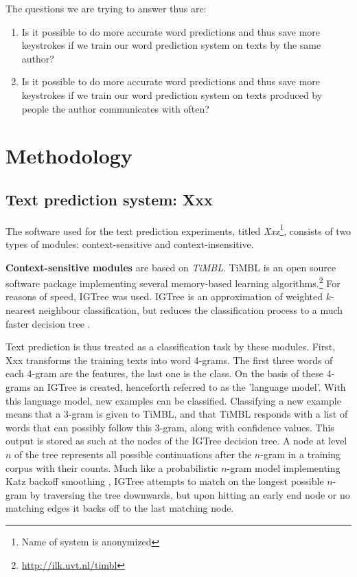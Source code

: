 \documentclass[11pt]{article}
\begin{document}
The questions we are trying to answer thus are:

\begin{enumerate}
\item Is it possible to do more accurate word predictions and thus save more keystrokes if we train our word prediction system on texts by the same author?
\item Is it possible to do more accurate word predictions and thus save more keystrokes if we train our word prediction system on texts produced by people the author communicates with often?
\end{enumerate}

\section{Methodology}

\subsection{Text prediction system: Xxx}

The software used for the text prediction experiments, titled \emph{Xxx}\footnote{Name of system is anonymized}, consists of two types of modules: context-sensitive and context-insensitive. 

\textbf{Context-sensitive modules} are based on \emph{TiMBL}. TiMBL is an open source software package implementing several memory-based learning algorithms.\footnote{\url{http://ilk.uvt.nl/timbl}} For reasons of speed, IGTree was used. IGTree is an approximation of weighted $k$-nearest neighbour classification, but reduces the classification process to a much faster decision tree \cite{daelemans97}.

Text prediction is thus treated as a classification task by these modules. First, Xxx transforms the training texts into word 4-grams. The first three words of each 4-gram are the features, the last one is the class. On the basis of these 4-grams an IGTree is created, henceforth referred to as the 'language model'. With this language model, new examples can be classified. Classifying a new example means that a 3-gram is given to TiMBL, and that TiMBL responds with a list of words that can possibly follow this 3-gram, along with confidence values. This output is stored as such at the nodes of the IGTree decision tree. A node at level $n$ of the tree represents all possible continuations after the $n$-gram in a training corpus with their counts. Much like a probabilistic $n$-gram model implementing Katz backoff smoothing \cite{katz87}, IGTree attempts to match on the longest possible $n$-gram by traversing the tree downwards, but upon hitting an early end node or no matching edges it backs off to the last matching node.
\end{document}
